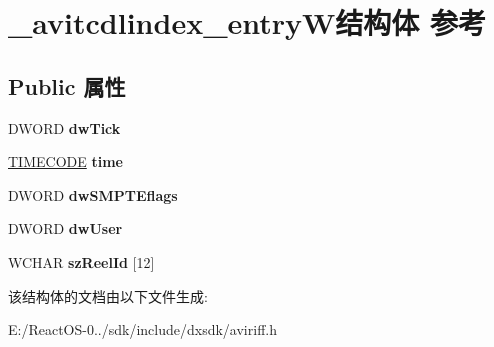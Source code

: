 \hypertarget{struct__avitcdlindex__entry_w}{}\section{\+\_\+avitcdlindex\+\_\+entry\+W结构体 参考}
\label{struct__avitcdlindex__entry_w}
\subsection*{Public 属性}
\begin{DoxyCompactItemize}
\item 
\mbox{\label{struct__avitcdlindex__entry_w_ae637787a9805c143d89587c8adef5055}} 
D\+W\+O\+RD {\bfseries dw\+Tick}
\item 
\mbox{\label{struct__avitcdlindex__entry_w_a1de07ba10924dbca1d950087dd57ae5a}} 
\hyperlink{union__timecode}{T\+I\+M\+E\+C\+O\+DE} {\bfseries time}
\item 
\mbox{\label{struct__avitcdlindex__entry_w_a7398e70e641233903f3794374a38b50d}} 
D\+W\+O\+RD {\bfseries dw\+S\+M\+P\+T\+Eflags}
\item 
\mbox{\label{struct__avitcdlindex__entry_w_a9287272203f32827cf3d2cde54bcf08a}} 
D\+W\+O\+RD {\bfseries dw\+User}
\item 
\mbox{\label{struct__avitcdlindex__entry_w_a02edb2ff0201e90daf33df4f77332644}} 
W\+C\+H\+AR {\bfseries sz\+Reel\+Id} \mbox{[}12\mbox{]}
\end{DoxyCompactItemize}


该结构体的文档由以下文件生成\+:\begin{DoxyCompactItemize}
\item 
E\+:/\+React\+O\+S-\/0../sdk/include/dxsdk/aviriff.\+h\end{DoxyCompactItemize}
